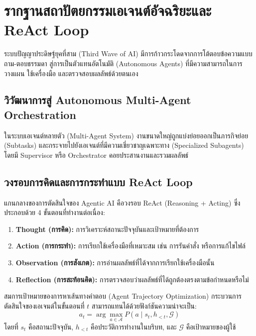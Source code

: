 \chapter{รากฐานสถาปัตยกรรมเอเจนต์อัจฉริยะและ ReAct Loop}

ระบบปัญญาประดิษฐ์ยุคที่สาม (Third Wave of AI) มีการก้าวกระโดดจากการโต้ตอบข้อความแบบถาม-ตอบธรรมดา สู่การเป็นตัวแทนอัตโนมัติ (Autonomous Agents) ที่มีความสามารถในการวางแผน ใช้เครื่องมือ และตรวจสอบผลลัพธ์ด้วยตนเอง

\section{วิวัฒนาการสู่ Autonomous Multi-Agent Orchestration}

ในระบบเอเจนต์หลายตัว (Multi-Agent System) งานขนาดใหญ่ถูกแบ่งย่อยออกเป็นภารกิจย่อย (Subtasks) และกระจายไปยังเอเจนต์ที่มีความเชี่ยวชาญเฉพาะทาง (Specialized Subagents) โดยมี Supervisor หรือ Orchestrator คอยประสานงานและรวมผลลัพธ์

\section{วงรอบการคิดและการกระทำแบบ ReAct Loop}

แกนกลางของการตัดสินใจของ Agentic AI คือวงรอบ ReAct (Reasoning + Acting) ซึ่งประกอบด้วย 4 ขั้นตอนที่ทำงานต่อเนื่อง:
\begin{enumerate}
    \item \textbf{Thought (การคิด):} การวิเคราะห์สถานะปัจจุบันและเป้าหมายที่ต้องการ
    \item \textbf{Action (การกระทำ):} การเรียกใช้เครื่องมือที่เหมาะสม เช่น การรันคำสั่ง หรือการแก้ไขไฟล์
    \item \textbf{Observation (การสังเกต):} การอ่านผลลัพธ์ที่ได้จากการเรียกใช้เครื่องมือนั้น
    \item \textbf{Reflection (การสะท้อนคิด):} การตรวจสอบว่าผลลัพธ์ที่ได้ถูกต้องตรงตามข้อกำหนดหรือไม่
\end{enumerate}

\begin{theoremlab}{สมการเป้าหมายของการหาเส้นทางคำตอบ (Agent Trajectory Optimization)}
กระบวนการตัดสินใจของเอเจนต์ในขั้นตอนที่ $t$ สามารถแทนได้ด้วยฟังก์ชันความน่าจะเป็น:
\begin{equation}
a_t = \arg\max_{a \in \mathcal{A}} P(a \mid s_t, h_{<t}, \mathcal{G})
\end{equation}
โดยที่ $s_t$ คือสถานะปัจจุบัน, $h_{<t}$ คือประวัติการทำงานในบริบท, และ $\mathcal{G}$ คือเป้าหมายของผู้ใช้
\end{theoremlab}
